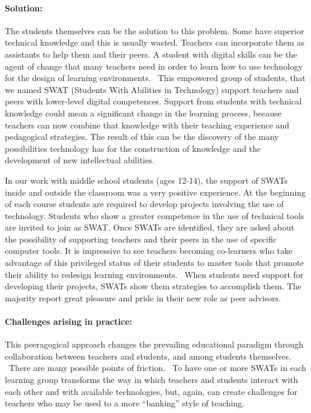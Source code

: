 \paragraph{Solution:}\label{solution}

The students themselves can be the solution to this problem. Some have
superior technical knowledge and this is usually wasted. Teachers can
incorporate them as assistants to help them and their peers. A student
with digital skills can be the agent of change that many teachers need
in order to learn how to use technology for the design of learning
environments. ~This empowered group of students, that we named SWAT
(Students With Abilities in Technology) support teachers and peers with
lower-level digital competences. Support from students with technical
knowledge could mean a significant change in the learning process,
because teachers can now combine that knowledge with their teaching
experience and pedagogical strategies. The result of this can be the
discovery of the many possibilities technology has for the construction
of knowledge and the development of new intellectual abilities.

In our work with middle school students (ages 12-14), the support of
SWATs inside and outside the classroom was a very positive experience.
At the beginning of each course students are required to develop
projects involving the use of technology. Students who show a greater
competence in the use of technical tools are invited to join as SWAT.
Once SWATs are identified, they are asked about the possibility of
supporting teachers and their peers in the use of specific computer
tools. It is impressive to see teachers becoming co-learners who take
advantage of this privileged status of their students to master tools
that promote their ability to redesign learning environments. ~When
students need support for developing their projects, SWATs show them
strategies to accomplish them. The majority report great pleasure and
pride in their new role as peer advisors.

\paragraph{Challenges arising in
practice:}\label{challenges-arising-in-practice}

This peeragogical approach changes the prevailing educational paradigm
through collaboration between teachers and students, and among students
themselves. ~There are many possible points of friction. ~To have one or
more SWATs in each learning group transforms the way in which teachers
and students interact with each other and with available technologies,
but, again, can create challenges for teachers who may be used to a more
``banking'' style of teaching.

